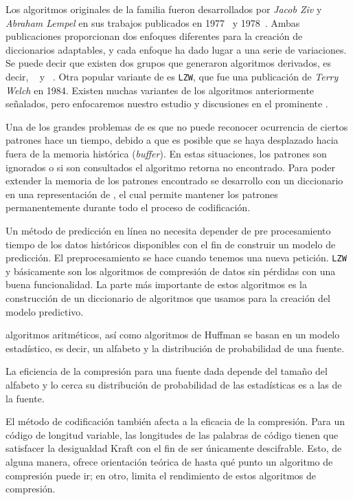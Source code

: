  
Los algoritmos originales de la familia fueron desarrollados por \emph{Jacob Ziv} y \emph{Abraham Lempel} en sus trabajos publicados en 1977~\cite{ZivLempel1977} y 1978~\cite{ZivLempel1978}. Ambas publicaciones proporcionan dos enfoques diferentes para la creación de diccionarios adaptables, y cada enfoque ha dado lugar a una serie de variaciones. Se puede decir que existen dos grupos que generaron algoritmos derivados, es decir, \lzSieteSiete~\cite{ZivLempel1977} y \lzSieteOcho~\cite{ZivLempel1978}. Otra popular variante  de \lzSieteOcho es \texttt{LZW}, que fue una publicación de \emph{Terry Welch} en 1984. Existen muchas variantes de los algoritmos anteriormente señalados,  pero enfocaremos nuestro estudio y discusiones en el prominente \lzSieteOcho. 


Una de los grandes problemas de \lzSieteSiete es que no puede reconocer ocurrencia de ciertos patrones hace un tiempo, debido a que es posible que se haya desplazado hacia fuera de la memoria histórica (\emph{buffer}). En estas situaciones, los patrones son ignorados o si son consultados el algoritmo retorna no encontrado. Para poder extender la memoria de los patrones encontrado se desarrollo \lzSieteOcho con un diccionario en una representación de \trie, el cual permite mantener los patrones permanentemente durante todo el proceso de codificación.



Un método de predicción en línea no necesita depender de pre procesamiento tiempo de los datos históricos disponibles con el fin de construir un modelo de predicción. El preprocesamiento se hace cuando tenemos una nueva petición. \texttt{LZW} y \lzSieteOcho básicamente son los algoritmos de compresión de datos sin pérdidas con una buena funcionalidad. La parte más importante de estos algoritmos es la construcción de un diccionario de algoritmos que usamos para la creación del modelo predictivo. 






algoritmos aritméticos, así como algoritmos de Huffman se basan en un modelo estadístico, es decir, un alfabeto y la distribución de probabilidad de una fuente. 

La eficiencia de la compresión para una fuente dada depende del tamaño del alfabeto y lo cerca su distribución de probabilidad de las estadísticas es a las de la fuente. 


El método de codificación también afecta a la eficacia de la compresión. 
Para un código de longitud variable, las longitudes de las palabras de código tienen que satisfacer la desigualdad Kraft con el fin de ser únicamente descifrable. Esto, de alguna manera, ofrece orientación teórica de hasta qué punto un algoritmo de compresión puede ir; en otro, limita el rendimiento de estos algoritmos de compresión.

